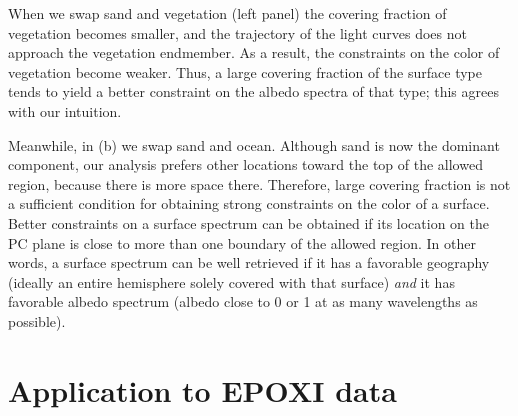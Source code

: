 \documentclass[iop,numberedappendix,apj]{emulateapj}
\begin{document}
When we swap sand and vegetation (left panel) the covering fraction of vegetation becomes smaller, and the trajectory of the light curves does not approach the vegetation endmember. As a result, the constraints on the color of vegetation become weaker. Thus, a large covering fraction of the surface type tends to yield a better constraint on the albedo spectra of that type; this agrees with our intuition.  

Meanwhile, in (b) we swap sand and ocean.  
Although sand is now the dominant component, 
our analysis prefers other locations toward the top of the allowed region, because there is more space there. 
Therefore, large covering fraction is not a sufficient condition for obtaining strong constraints on the color of a surface. 
Better constraints on a surface spectrum can be obtained if its location on the PC plane is close to more than one boundary of the allowed region. 
In other words, a surface spectrum can be well retrieved if it has a favorable geography (ideally an entire hemisphere solely covered with that surface) {\it and} it has favorable albedo spectrum (albedo close to 0 or 1 at as many wavelengths as possible). 


\section{Application to EPOXI data}
\label{s:EPOXI}
\end{document}
